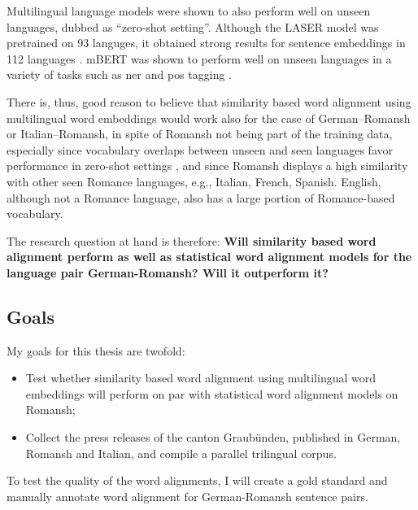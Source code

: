 Multilingual language models were shown to also perform  well on unseen languages, dubbed as \enquote{zero-shot setting}. 
Although the LASER model was pretrained on 93 languges, it obtained strong results for sentence embeddings in 112 languages \autocite{artexte-schwenk-2019-laser}. 
mBERT was shown to perform well on unseen languages in a variety of tasks such as \acrfull{ner} and \acrfull{pos} tagging \autocite{pires-etal-2019-multilingual}.

There is, thus, good reason to believe that similarity based word alignment using multilingual word embeddings would work also for the case of German--Romansh or Italian--Romansh, in spite of Romansh not being part of the training data, especially since vocabulary overlaps between unseen and seen languages favor performance in zero-shot settings \autocite{pires-etal-2019-multilingual}, and since Romansh displays a high similarity with other seen Romance languages, e.g., Italian, French, Spanish. 
English, although not a Romance language, also has a large portion of Romance-based vocabulary.

The research question at hand is therefore: \textbf{Will similarity based word alignment perform as well as statistical word alignment models for the language pair German-Romansh? 
Will it outperform it?}



\subsection{Goals}
My goals for this thesis are twofold:
\begin{itemize}
	\item Test whether similarity based word alignment using multilingual word embeddings will perform on par with statistical word alignment models on Romansh;

	\item Collect the press releases of the canton Graubünden, published in German, Romansh and Italian, and compile a parallel trilingual corpus. 

\end{itemize}
To test the quality of the word alignments, I will create a gold standard and manually annotate word alignment for German-Romansh sentence pairs.

